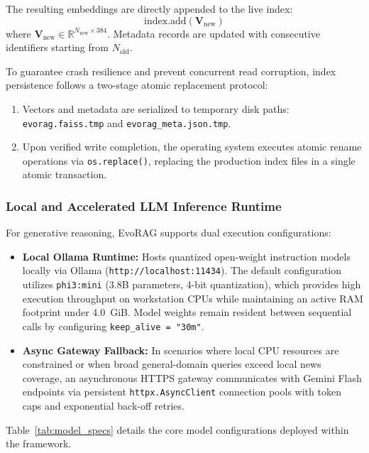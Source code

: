The resulting embeddings are directly appended to the live index:
\begin{equation}
\text{index.add}(\mathbf{V}_{\text{new}})
\end{equation}
where $\mathbf{V}_{\text{new}} \in \mathbb{R}^{N_{\text{new}} \times 384}$. Metadata records are updated with consecutive identifiers starting from $N_{\text{old}}$.

To guarantee crash resilience and prevent concurrent read corruption, index persistence follows a two-stage atomic replacement protocol:
\begin{enumerate}
    \item Vectors and metadata are serialized to temporary disk paths: \texttt{evorag.faiss.tmp} and \texttt{evorag\_meta.json.tmp}.
    \item Upon verified write completion, the operating system executes atomic rename operations via \texttt{os.replace()}, replacing the production index files in a single atomic transaction.
\end{enumerate}

\subsubsection{Local and Accelerated LLM Inference Runtime}
For generative reasoning, EvoRAG supports dual execution configurations:
\begin{itemize}
    \item \textbf{Local Ollama Runtime:} Hosts quantized open-weight instruction models locally via Ollama (\texttt{http://localhost:11434}). The default configuration utilizes \texttt{phi3:mini} (3.8B parameters, 4-bit quantization), which provides high execution throughput on workstation CPUs while maintaining an active RAM footprint under 4.0~GiB. Model weights remain resident between sequential calls by configuring \texttt{keep\_alive = "30m"}.
    \item \textbf{Async Gateway Fallback:} In scenarios where local CPU resources are constrained or when broad general-domain queries exceed local news coverage, an asynchronous HTTPS gateway communicates with Gemini Flash endpoints via persistent \texttt{httpx.AsyncClient} connection pools with token caps and exponential back-off retries.
\end{itemize}

Table~\ref{tab:model_specs} details the core model configurations deployed within the framework.

